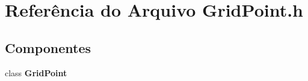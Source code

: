 \section{Referência do Arquivo Grid\+Point.\+h}
\label{_grid_point_8h}
\subsection*{Componentes}
\begin{DoxyCompactItemize}
\item 
class {\bf Grid\+Point}
\end{DoxyCompactItemize}

